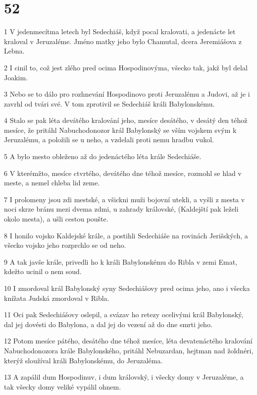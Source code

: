 \chapter{52}

\par 1 V jedenmecítma letech byl Sedechiáš, když pocal kralovati, a jedenácte let kraloval v Jeruzaléme. Jméno matky jeho bylo Chamutal, dcera Jeremiášova z Lebna.
\par 2 I cinil to, což jest zlého pred ocima Hospodinovýma, všecko tak, jakž byl delal Joakim.
\par 3 Nebo se to dálo pro rozhnevání Hospodinovo proti Jeruzalému a Judovi, až je i zavrhl od tvári své. V tom zprotivil se Sedechiáš králi Babylonskému.
\par 4 Stalo se pak léta devátého kralování jeho, mesíce desátého, v desátý den téhož mesíce, že pritáhl Nabuchodonozor král Babylonský se vším vojskem svým k Jeruzalému, a položili se u neho, a vzdelali proti nemu hradbu vukol.
\par 5 A bylo mesto obleženo až do jedenáctého léta krále Sedechiáše.
\par 6 V kterémžto, mesíce ctvrtého, devátého dne téhož mesíce, rozmohl se hlad v meste, a nemel chleba lid zeme.
\par 7 I prolomeny jsou zdi mestské, a všickni muži bojovní utekli, a vyšli z mesta v noci skrze bránu mezi dvema zdmi, u zahrady královské, (Kaldejští pak leželi okolo mesta), a ušli cestou poušte.
\par 8 I honilo vojsko Kaldejské krále, a postihli Sedechiáše na rovinách Jerišských, a všecko vojsko jeho rozprchlo se od neho.
\par 9 A tak javše krále, privedli ho k králi Babylonskému do Ribla v zemi Emat, kdežto ucinil o nem soud.
\par 10 I zmordoval král Babylonský syny Sedechiášovy pred ocima jeho, ano i všecka knížata Judská zmordoval v Ribla.
\par 11 Oci pak Sedechiášovy oslepil, a svázav ho retezy ocelivými král Babylonský, dal jej dovésti do Babylona, a dal jej do vezení až do dne smrti jeho.
\par 12 Potom mesíce pátého, desátého dne téhož mesíce, léta devatenáctého kralování Nabuchodonozora krále Babylonského, pritáhl Nebuzardan, hejtman nad žoldnéri, kterýž sloužíval králi Babylonskému, do Jeruzaléma.
\par 13 A zapálil dum Hospodinuv, i dum královský, i všecky domy v Jeruzaléme, a tak všecky domy veliké vypálil ohnem.
